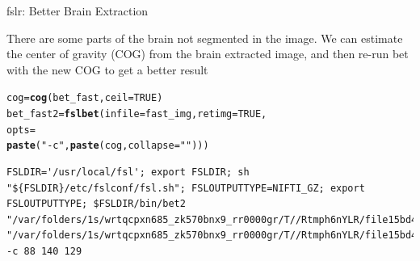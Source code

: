\documentclass[11pt]{beamer}\usepackage[]{graphicx}\usepackage[]{color}
\makeatletter
\newcommand{\hlnum}[1]{\textcolor[rgb]{0.686,0.059,0.569}{#1}}%
\newcommand{\hlstr}[1]{\textcolor[rgb]{0.192,0.494,0.8}{#1}}%
\newcommand{\hlstd}[1]{\textcolor[rgb]{0.345,0.345,0.345}{#1}}%
\newcommand{\hlkwb}[1]{\textcolor[rgb]{0.69,0.353,0.396}{#1}}%
\newcommand{\hlkwc}[1]{\textcolor[rgb]{0.333,0.667,0.333}{#1}}%
\newcommand{\hlkwd}[1]{\textcolor[rgb]{0.737,0.353,0.396}{\textbf{#1}}}%
\newenvironment{kframe}{%
 \def\at@end@of@kframe{}%
 \ifinner\ifhmode%
  \def\at@end@of@kframe{\end{minipage}}%
  \begin{minipage}{\columnwidth}%
 \fi\fi%
 \def\FrameCommand##1{\hskip\@totalleftmargin \hskip-\fboxsep
 \colorbox{shadecolor}{##1}\hskip-\fboxsep
     \hskip-\linewidth \hskip-\@totalleftmargin \hskip\columnwidth}%
 \MakeFramed {\advance\hsize-\width
   \@totalleftmargin\z@ \linewidth\hsize
   \@setminipage}}%
 {\par\unskip\endMakeFramed%
 \at@end@of@kframe}
\newenvironment{knitrout}{}{} %
\makeatother
\begin{document}
\begin{frame}[fragile]{fslr: Better Brain Extraction}

There are some parts of the brain not segmented in the image.  We can estimate the center of gravity (COG) from the brain extracted image, and then re-run bet with the new COG to get a better result

\begin{knitrout}
\color{fgcolor}\begin{kframe}
\begin{alltt}
\hlstd{cog} \hlkwb{=} \hlkwd{cog}\hlstd{(bet_fast,} \hlkwc{ceil}\hlstd{=}\hlnum{TRUE}\hlstd{)}
\hlstd{bet_fast2} \hlkwb{=} \hlkwd{fslbet}\hlstd{(}\hlkwc{infile}\hlstd{=fast_img,} \hlkwc{retimg}\hlstd{=}\hlnum{TRUE}\hlstd{,}
                   \hlkwc{opts} \hlstd{=}
                     \hlkwd{paste}\hlstd{(}\hlstr{"-c"}\hlstd{,} \hlkwd{paste}\hlstd{(cog,} \hlkwc{collapse}\hlstd{=} \hlstr{" "}\hlstd{)))}
\end{alltt}
\begin{verbatim}
FSLDIR='/usr/local/fsl'; export FSLDIR; sh "${FSLDIR}/etc/fslconf/fsl.sh"; FSLOUTPUTTYPE=NIFTI_GZ; export FSLOUTPUTTYPE; $FSLDIR/bin/bet2 "/var/folders/1s/wrtqcpxn685_zk570bnx9_rr0000gr/T//Rtmph6nYLR/file15bd43cb86a9c.nii.gz" "/var/folders/1s/wrtqcpxn685_zk570bnx9_rr0000gr/T//Rtmph6nYLR/file15bd421e8d408" -c 88 140 129 
\end{verbatim}
\end{kframe}
\end{knitrout}
\end{frame}
\end{document}
